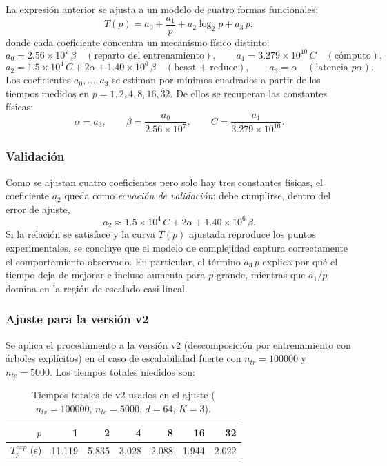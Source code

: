 La expresión anterior se ajusta a un modelo de cuatro formas funcionales:
\[
T(p) = a_0 + \frac{a_1}{p} + a_2\log_2 p + a_3\,p,
\]
donde cada coeficiente concentra un mecanismo físico distinto:
\[
a_0 = 2.56\times10^7\,\beta
\quad(\text{reparto del entrenamiento}),
\qquad
a_1 = 3.279\times10^{10}\,C
\quad(\text{cómputo}),
\]
\[
a_2 = 1.5\times10^4\,C + 2\alpha + 1.40\times10^6\,\beta
\quad(\text{bcast + reduce}),
\qquad
a_3 = \alpha
\quad(\text{latencia } p\alpha).
\]
Los coeficientes $a_0,\dots,a_3$ se estiman por mínimos cuadrados a partir de los tiempos medidos
en $p = 1,2,4,8,16,32$. De ellos se recuperan las constantes físicas:
\[
\alpha = a_3,
\qquad
\beta = \frac{a_0}{2.56\times10^7},
\qquad
C = \frac{a_1}{3.279\times10^{10}}.
\]

\subsubsection{Validación}

Como se ajustan cuatro coeficientes pero solo hay tres constantes físicas, el coeficiente $a_2$
queda como \emph{ecuación de validación}: debe cumplirse, dentro del error de ajuste,
\[
a_2 \approx 1.5\times10^4\,C + 2\alpha + 1.40\times10^6\,\beta.
\]
Si la relación se satisface y la curva $T(p)$ ajustada reproduce los puntos experimentales, se
concluye que el modelo de complejidad captura correctamente el comportamiento observado. En
particular, el término $a_3\,p$ explica por qué el tiempo deja de mejorar e incluso aumenta para
$p$ grande, mientras que $a_1/p$ domina en la región de escalado casi lineal.

\subsubsection{Ajuste para la versión v2}\label{sec:norm-v2}

Se aplica el procedimiento a la versión v2 (descomposición por entrenamiento con árboles
explícitos) en el caso de escalabilidad fuerte con $n_{tr}=100000$ y $n_{te}=5000$. Los tiempos
totales medidos son:

\begin{table}[H]
\centering
\begin{tabular}{rrrrrrr}
\toprule
$p$ & 1 & 2 & 4 & 8 & 16 & 32 \\
\midrule
$T_p^{exp}$ (s) & 11.119 & 5.835 & 3.028 & 2.088 & 1.944 & 2.022 \\
\bottomrule
\end{tabular}
\caption{Tiempos totales de v2 usados en el ajuste ($n_{tr}=100000$, $n_{te}=5000$, $d=64$, $K=3$).}
\end{table}

